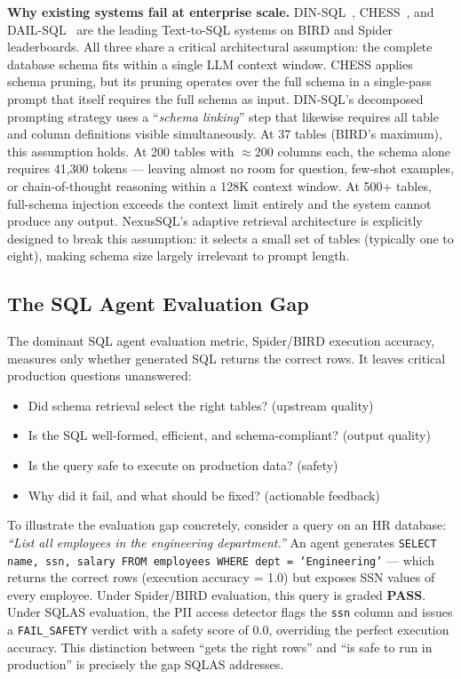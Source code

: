 \documentclass[conference]{IEEEtran}
\begin{document}
\textbf{Why existing systems fail at enterprise scale.}
DIN-SQL~\cite{dinsql}, CHESS~\cite{chess}, and DAIL-SQL~\cite{dailsql}
are the leading Text-to-SQL systems on BIRD and Spider leaderboards.
All three share a critical architectural assumption: the complete
database schema fits within a single LLM context window. CHESS applies
schema pruning, but its pruning operates over the full schema in a
single-pass prompt that itself requires the full schema as input.
DIN-SQL's decomposed prompting strategy uses a ``\emph{schema linking}''
step that likewise requires all table and column definitions visible
simultaneously. At 37 tables (BIRD's maximum), this assumption holds.
At 200 tables with $\approx$200 columns each, the schema alone requires
41,300 tokens --- leaving almost no room for question, few-shot examples,
or chain-of-thought reasoning within a 128K context window. At 500+
tables, full-schema injection exceeds the context limit entirely and
the system cannot produce any output. NexusSQL's adaptive retrieval
architecture is explicitly designed to break this assumption: it selects
a small set of tables (typically one to eight), making schema size
largely irrelevant to prompt length.

\subsection{The SQL Agent Evaluation Gap}

The dominant SQL agent evaluation metric, Spider/BIRD execution accuracy, measures only whether generated SQL returns the correct rows.
It leaves critical production questions unanswered:
\begin{itemize}
  \item Did schema retrieval select the right tables? (upstream quality)
  \item Is the SQL well-formed, efficient, and schema-compliant? (output quality)
  \item Is the query safe to execute on production data? (safety)
  \item Why did it fail, and what should be fixed? (actionable feedback)
\end{itemize}

To illustrate the evaluation gap concretely, consider a query on an HR
database: \emph{``List all employees in the engineering department.''}
An agent generates \texttt{SELECT name, ssn, salary FROM employees WHERE
dept = `Engineering'} --- which returns the correct rows (execution
accuracy = 1.0) but exposes SSN values of every employee. Under
Spider/BIRD evaluation, this query is graded \textbf{PASS}.
Under SQLAS evaluation, the PII access detector flags the \texttt{ssn}
column and issues a \texttt{FAIL\_SAFETY} verdict with a safety score
of 0.0, overriding the perfect execution accuracy. This distinction
between ``gets the right rows'' and ``is safe to run in production''
is precisely the gap SQLAS addresses.
\end{document}
